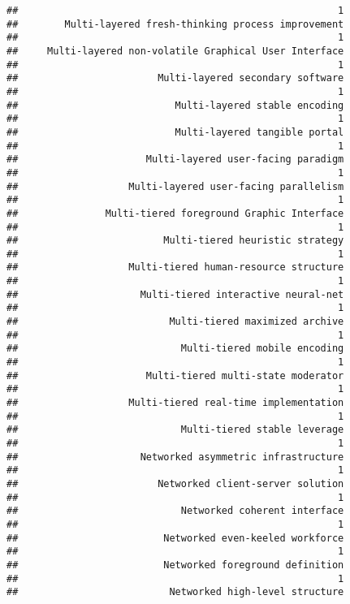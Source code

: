 \documentclass[
]{article}
\begin{document}
\begin{verbatim}
##                                                       1 
##        Multi-layered fresh-thinking process improvement 
##                                                       1 
##     Multi-layered non-volatile Graphical User Interface 
##                                                       1 
##                        Multi-layered secondary software 
##                                                       1 
##                           Multi-layered stable encoding 
##                                                       1 
##                           Multi-layered tangible portal 
##                                                       1 
##                      Multi-layered user-facing paradigm 
##                                                       1 
##                   Multi-layered user-facing parallelism 
##                                                       1 
##               Multi-tiered foreground Graphic Interface 
##                                                       1 
##                         Multi-tiered heuristic strategy 
##                                                       1 
##                   Multi-tiered human-resource structure 
##                                                       1 
##                     Multi-tiered interactive neural-net 
##                                                       1 
##                          Multi-tiered maximized archive 
##                                                       1 
##                            Multi-tiered mobile encoding 
##                                                       1 
##                      Multi-tiered multi-state moderator 
##                                                       1 
##                   Multi-tiered real-time implementation 
##                                                       1 
##                            Multi-tiered stable leverage 
##                                                       1 
##                     Networked asymmetric infrastructure 
##                                                       1 
##                        Networked client-server solution 
##                                                       1 
##                            Networked coherent interface 
##                                                       1 
##                         Networked even-keeled workforce 
##                                                       1 
##                         Networked foreground definition 
##                                                       1 
##                          Networked high-level structure 

\end{verbatim}
\end{document}
